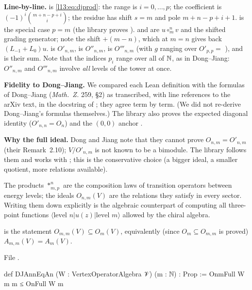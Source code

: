 \begin{dictionary}
\textbf{Line-by-line.}  is \eqref{l13:eq:djprod}: the range  is
$i = 0,\dots,p$; the coefficient is $(-1)^i\binom{m+n-p+i}{i}$; the residue has shift $s = m$ and pole $m+n-p+i+1$.
 is the special case $p = m$ (the library proves ).  and 
are $u\circ^n_mv$ and the shifted grading generator; note the shift $+(m-n)$, which at $m = n$ gives back $(L_{-1}+L_0)u$.
 is $O'_{n,m}$,  is $O''_{n,m}$,  is $O'''_{n,m}$ (with $g$ ranging over
$O'_{p,p} = $ ), and  is their sum. Note that the indices $p_i$ range over all of ${\mathbb{N}}$, as in
Dong--Jiang: $O''_{n,m}$ and $O'''_{n,m}$ involve \emph{all} levels of the tower at once.

\textbf{Fidelity to Dong--Jiang.} We compared each Lean definition with the formulas of Dong--Jiang (\emph{Math.\ Z.} 259, §2)
as transcribed, with line references to the arXiv text, in the docstring of ; they agree
term by term. (We did not re-derive Dong--Jiang's formulas themselves.) The library
also proves the expected diagonal identity  ($O'_{n,n} = O_n$) and the
$(0,0)$ anchor .

\textbf{Why the full ideal.} Dong and Jiang note that they cannot prove $O_{n,m} = O'_{n,m}$ (their Remark~2.10); $V/O'_{n,m}$
is not known to be a bimodule. The library follows them and works with ; this is the conservative choice (a
bigger ideal, a smaller quotient, more relations available).
\end{dictionary}

\begin{physics}
The products $*^n_{m,p}$ are the composition laws of transition operators between energy levels; the ideals $O_{n,m}(V)$ are the
relations they satisfy in every sector. Writing them down explicitly is the algebraic counterpart of computing all three-point
functions $\langle\text{level }n|u(z)|\text{level }m\rangle$ allowed by the chiral algebra.
\end{physics}

\begin{definition}\label{l13:def:djann}
 is the statement $O_{m,m}(V)\subseteq O_m(V)$, equivalently (since $O_m\subseteq O_{m,m}$ is proved)
$A_{m,m}(V) = A_m(V)$.
\end{definition}
\noindent File .
\begin{leancode}
def DJAnnEqAn (W : VertexOperatorAlgebra 𝒱) (m : ℕ) : Prop :=
  OnmFull W m m ≤ OnFull W m
\end{leancode}

